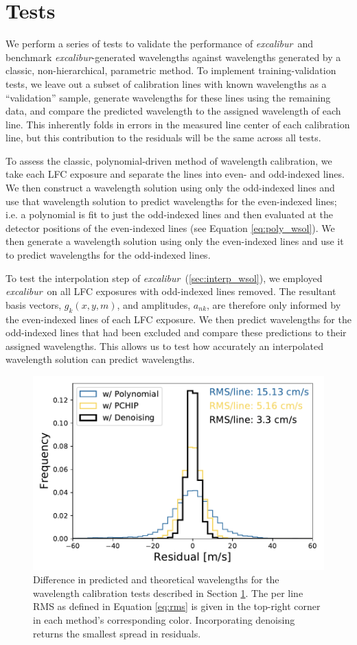 \documentclass[twocolumn,table,xcolor,trackchanges]{aastex63}
\newcommand{\project}[1]{\textsl{#1}}
\newcommand{\name}{\project{excalibur}}
\begin{document}
\section{Tests}\label{sec:tests}
We perform a series of tests to validate the performance of \name\ and benchmark \name -generated wavelengths against wavelengths generated by a classic, non-hierarchical, parametric method.  To implement training-validation tests, we leave out a subset of calibration lines with known wavelengths as a ``validation'' sample, generate wavelengths for these lines using the remaining data, and compare the predicted wavelength to the assigned wavelength of each line.  This inherently folds in errors in the measured line center of each calibration line, but this contribution to the residuals will be the same across all tests.

To assess the classic, polynomial-driven method of wavelength calibration, we take each LFC exposure and separate the lines into even- and odd-indexed lines.  We then construct a wavelength solution using only the odd-indexed lines and use  that wavelength solution to predict wavelengths for the even-indexed lines; i.e. a polynomial is fit to just the odd-indexed lines and then evaluated at the detector positions of the even-indexed lines (see Equation \ref{eq:poly_wsol}).  We then generate a wavelength solution using only the even-indexed lines and use it to predict wavelengths for the odd-indexed lines.

To test the interpolation step of \name\ (\textsection \ref{sec:interp_wsol}), we employed \name\ on all LFC exposures with odd-indexed lines removed.  The resultant basis vectors, $g_k(x,y,m)$,  and amplitudes, $a_{nk}$, are therefore only informed by the even-indexed lines of each LFC exposure.  We then predict wavelengths for the odd-indexed lines that had been excluded and compare these predictions to their assigned wavelengths.  This allows us to test how accurately an interpolated wavelength solution can predict wavelengths.

\begin{figure}[t]
\centering
\includegraphics[width=.45\textwidth]{Figures/all_results.pdf}
\caption{Difference in predicted and theoretical wavelengths for the wavelength calibration tests described in Section \ref{sec:tests}.  The per line RMS as defined in Equation \ref{eq:rms} is given in the top-right corner in each method's corresponding color.  Incorporating denoising returns the smallest spread in residuals.}
\label{fig:testHists}
\end{figure} 
\end{document}
